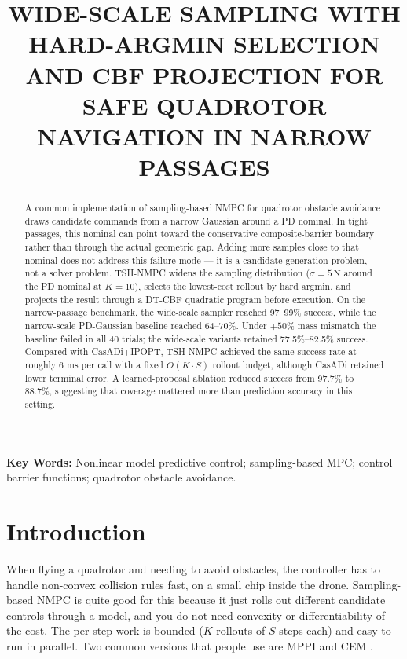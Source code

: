 \documentclass[11pt,onecolumn,a4paper]{article}
\begin{document}
\title{\textbf{WIDE-SCALE SAMPLING WITH HARD-ARGMIN SELECTION AND CBF PROJECTION
FOR SAFE QUADROTOR NAVIGATION IN NARROW PASSAGES}}


\date{}
\maketitle

\begin{abstract}\noindent
A common implementation of sampling-based NMPC for quadrotor obstacle
avoidance draws candidate commands from a narrow Gaussian around a PD
nominal. In tight passages, this nominal can point toward the
conservative composite-barrier boundary rather than through the actual
geometric gap. Adding more samples close to that nominal does not
address this failure mode --- it is a candidate-generation problem,
not a solver problem. TSH-NMPC widens the sampling distribution
($\sigma = 5\,\mathrm{N}$ around the PD nominal at $K = 10$),
selects the lowest-cost rollout by hard argmin, and projects the
result through a DT-CBF quadratic program before execution. On the
narrow-passage benchmark, the wide-scale sampler reached 97--99\%
success, while the narrow-scale PD-Gaussian baseline reached
64--70\%. Under $+50\%$ mass mismatch the baseline failed in all
40 trials; the wide-scale variants retained 77.5\%--82.5\% success.
Compared with CasADi+IPOPT, TSH-NMPC achieved the same success rate
at roughly 6 ms per call with a fixed $O(K \cdot S)$ rollout budget,
although CasADi retained lower terminal error. A learned-proposal
ablation reduced success from 97.7\% to 88.7\%, suggesting that
coverage mattered more than prediction accuracy in this setting.
\end{abstract}

\medskip
\noindent\textbf{Key Words:} Nonlinear model predictive control; sampling-based MPC; control barrier functions; quadrotor obstacle avoidance.
\medskip

\section{Introduction}

When flying a quadrotor and needing to avoid obstacles, the controller
has to handle non-convex collision rules fast, on a small chip inside
the drone. Sampling-based NMPC is quite good for this because it just
rolls out different candidate controls through a model, and you do
not need convexity or differentiability of the cost. The per-step work
is bounded ($K$ rollouts of $S$ steps each) and easy to run in
parallel. Two common versions that people use are MPPI
\cite{WIL17,WIL18} and CEM \cite{BOT13}.
\end{document}
